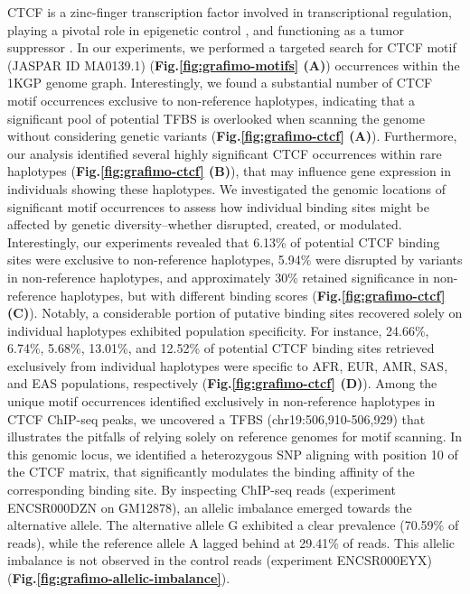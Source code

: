 \documentclass[a4paper, titlepage, openright]{book}
\begin{document}
CTCF is a zinc-finger transcription factor involved in transcriptional regulation, playing a pivotal role in epigenetic control \citep{ishihara2006ctcf}, and functioning as a tumor suppressor \citep{fiorentino2012tumor}. In our experiments, we performed a targeted search for CTCF motif (JASPAR ID MA0139.1) (\textbf{Fig.\ref{fig:grafimo-motifs} (A)}) occurrences within the 1KGP genome graph. Interestingly, we found a substantial number of CTCF motif occurrences exclusive to non-reference haplotypes, indicating that a significant pool of potential TFBS is overlooked when scanning the genome without considering genetic variants (\textbf{Fig.\ref{fig:grafimo-ctcf} (A)}). Furthermore, our analysis identified several highly significant CTCF occurrences within rare haplotypes (\textbf{Fig.\ref{fig:grafimo-ctcf} (B)}), that may influence gene expression in individuals showing these haplotypes. We investigated the genomic locations of significant motif occurrences to assess how individual binding sites might be affected by genetic diversity--whether disrupted, created, or modulated. Interestingly, our experiments revealed that 6.13\% of potential CTCF binding sites were exclusive to non-reference haplotypes, 5.94\% were disrupted by variants in non-reference haplotypes, and approximately 30\% retained significance in non-reference haplotypes, but with different binding scores (\textbf{Fig.\ref{fig:grafimo-ctcf} (C)}). Notably, a considerable portion of putative binding sites recovered solely on individual haplotypes exhibited population specificity. For instance, 24.66\%, 6.74\%, 5.68\%, 13.01\%, and 12.52\% of potential CTCF binding sites retrieved exclusively from individual haplotypes were specific to AFR, EUR, AMR, SAS, and EAS populations, respectively (\textbf{Fig.\ref{fig:grafimo-ctcf} (D)}). Among the unique motif occurrences identified exclusively in non-reference haplotypes in CTCF ChIP-seq peaks, we uncovered a TFBS (chr19:506,910-506,929) that illustrates the pitfalls of relying solely on reference genomes for motif scanning. In this genomic locus, we identified a heterozygous SNP aligning with position 10 of the CTCF matrix, that significantly modulates the binding affinity of the corresponding binding site. By inspecting ChIP-seq reads (experiment ENCSR000DZN on GM12878), an allelic imbalance emerged towards the alternative allele. The alternative allele G exhibited a clear prevalence (70.59\% of reads), while the reference allele A lagged behind at 29.41\% of reads. This allelic imbalance is not observed in the control reads (experiment ENCSR000EYX) (\textbf{Fig.\ref{fig:grafimo-allelic-imbalance}}).
\end{document}
